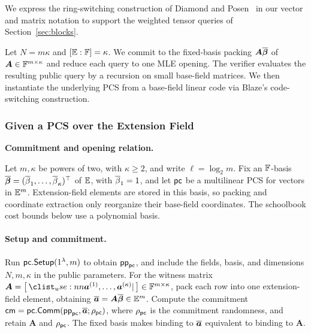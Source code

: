 We express the ring-switching construction of Diamond and
Posen~\cite{eurocrypt/DiamondP26} in our vector and matrix notation
to support the weighted tensor queries of Section~\ref{sec:blocks}.

Let \(N=m\kappa\) and \([\mathbb{E}:{\mathbb{F}}]=\kappa\).
We commit to the fixed-basis packing \(\bm A\overline{\bm\beta}\)
of \(\bm A\in{\mathbb{F}}^{m\times\kappa}\) and reduce each query
to one MLE opening. The verifier evaluates the resulting public
query by a recursion on small base-field matrices.
We then instantiate the underlying PCS from a base-field linear
code via Blaze's code-switching construction.

\subsubsection{Given a PCS over the Extension Field}

\medskip\noindent\textbf{Commitment and opening relation.}

Let \(m,\kappa\) be powers of two, with \(\kappa\geq2\), and write
\(\ell=\log_2m\).
Fix an \({\mathbb{F}}\)-basis
\(\overline{\bm\beta}=(\overline{\beta}_1,\ldots,\overline{\beta}_\kappa)^\top\)
of \(\mathbb{E}\), with \(\overline{\beta}_1=1\), and let \({\sf pc}\)
be a multilinear PCS for vectors in \(\mathbb{E}^m\).
Extension-field elements are stored in this basis, so packing
and coordinate extraction only reorganize their base-field coordinates.
The schoolbook cost bounds below use a polynomial basis.

\paragraph{Setup and commitment.}
Run \({\sf pc}.{\sf Setup}(1^\lambda,m)\) to obtain
\(\mathsf{pp}_{{\sf pc}}\), and include the fields, basis, and dimensions
\(N,m,\kappa\) in the public parameters.
For the witness matrix
\(\bm A=\concat{\bm a^{(1)},\ldots,\bm a^{(\kappa)}}
\in\Field^{m\times\kappa}\), pack each row into one
extension-field element, obtaining
\(\overline{\bm a}=\bm A\overline{\bm\beta}\in\mathbb{E}^m\).
Compute the commitment
\(\mathsf{cm}={\sf pc}.{\sf Comm}(\mathsf{pp}_{{\sf pc}},\overline{\bm a};
\rho_{{\sf pc}})\), where \(\rho_{{\sf pc}}\) is the commitment
randomness, and retain \(\bm A\) and \(\rho_{{\sf pc}}\).
The fixed basis makes binding to \(\overline{\bm a}\) equivalent
to binding to \(\bm A\).

